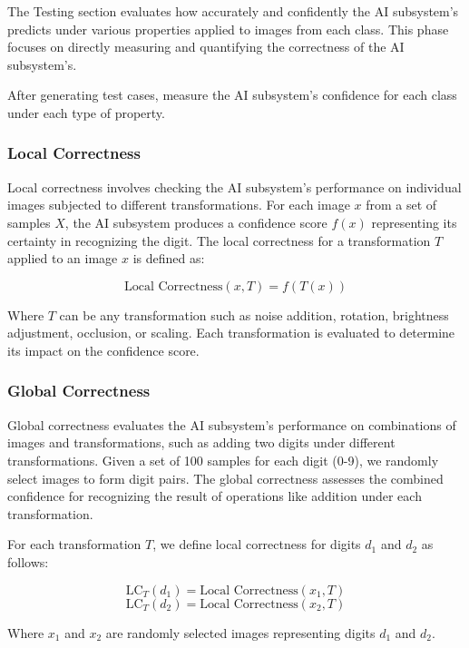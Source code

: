 \documentclass[10pt, conference, a4paper, final]{IEEEtran}
\begin{document}
The Testing section evaluates how accurately and confidently the  AI subsystem's predicts under various properties applied to images from each class. This phase focuses on directly measuring and quantifying the correctness of the  AI subsystem's.

 After generating test cases, measure the  AI subsystem's confidence for each class under each type of property.
     

  
    \subsubsection{Local Correctness}

    Local correctness involves checking the AI subsystem's performance on individual images subjected to different transformations. For each image \( x \) from a set of samples \( X \), the AI subsystem produces a confidence score \( f(x) \) representing its certainty in recognizing the digit. The local correctness for a transformation \( T \) applied to an image \( x \) is defined as:

    \[
        \text{Local Correctness}(x, T) = f(T(x))
    \]

    Where \( T \) can be any transformation such as noise addition, rotation, brightness adjustment, occlusion, or scaling. Each transformation is evaluated to determine its impact on the confidence score.

    
    \subsubsection{Global Correctness}

    Global correctness evaluates the AI subsystem's performance on combinations of images and transformations, such as adding two digits under different transformations. Given a set of 100 samples for each digit (0-9), we randomly select images to form digit pairs. The global correctness assesses the combined confidence for recognizing the result of operations like addition under each transformation.

    For each transformation \( T \), we define local correctness for digits \( d_1 \) and \( d_2 \) as follows:
    
    \[
    \text{LC}_{T}(d_1) = \text{Local Correctness}(x_1, T)
    \]
    \[
    \text{LC}_{T}(d_2) = \text{Local Correctness}(x_2, T)
    \]
    
    Where \( x_1 \) and \( x_2 \) are randomly selected images representing digits \( d_1 \) and \( d_2 \).
    
\end{document}
